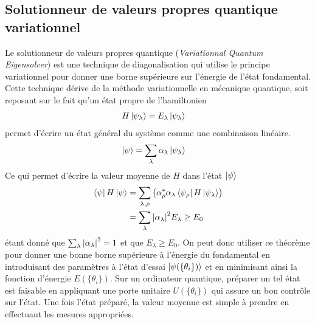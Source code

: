 \documentclass[../main.tex]{subfiles}
\begin{document}
    \subsection{Solutionneur de valeurs propres quantique variationnel} %
    \label{sub:vqe}
    Le solutionneur de valeurs propres quantique (\textit{Variationnal Quantum
    Eigensolver}) est une technique de diagonalisation qui utilise le
    principe variationnel pour donner une borne supérieure sur l'énergie de
    l'état fondamental. Cette technique dérive de la méthode variationnelle en
    mécanique quantique, soit reposant sur le fait qu'un état propre de
    l'hamiltonien
    \begin{align}
        H\ket{\psi_\lambda}&=E_\lambda\ket{\psi_\lambda}
    \end{align}
    permet d'écrire un état général du système comme une combinaison linéaire.
    \begin{align}
        \ket{\psi}&=\sum_\lambda\alpha_\lambda\ket{\psi_\lambda}
    \end{align}
    Ce qui permet d'écrire la valeur moyenne de $H$ dans l'état $\ket{\psi}$
    \begin{align}
        \bra{\psi}H\ket{\psi}&=\sum_{\lambda,\rho}\qty(\alpha_\rho^*\alpha_\lambda
        \bra{\psi_\rho}H\ket{\psi_\lambda})\\
        &=\sum_\lambda\abs{\alpha_\lambda}^2E_\lambda\geq E_0
    \end{align}
    étant donné que $\sum_\lambda\abs{\alpha_\lambda}^2=1$ et que $E_\lambda\geq
    E_0$. On peut donc utiliser ce théorème pour donner une bonne borne supérieure
    à l'énergie du fondamental en introduisant des paramètres à l'état d'essai
    $\ket{\psi(\{\theta_i\})}$ et en minimisant ainsi la fonction d'énergie
    $E(\{\theta_i\})$. Sur un ordinateur quantique, préparer un tel état est
    faisable en appliquant une porte unitaire $U(\{\theta_i\})$ qui assure un
    bon contrôle sur l'état. Une fois l'état préparé, la valeur moyenne est
    simple à prendre en effectuant les mesures appropriées.
    
\end{document}
